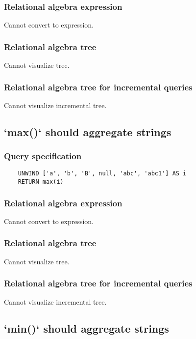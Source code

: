 	\subsubsection*{Relational algebra expression}

	Cannot convert to expression.

	\subsubsection*{Relational algebra tree}

	Cannot visualize tree.

	\subsubsection*{Relational algebra tree for incremental queries}

	Cannot visualize incremental tree.
	\subsection{`max()` should aggregate strings}

	\subsubsection*{Query specification}

	\begin{lstlisting}
	UNWIND ['a', 'b', 'B', null, 'abc', 'abc1'] AS i
	RETURN max(i)
	\end{lstlisting}


	\subsubsection*{Relational algebra expression}

	Cannot convert to expression.

	\subsubsection*{Relational algebra tree}

	Cannot visualize tree.

	\subsubsection*{Relational algebra tree for incremental queries}

	Cannot visualize incremental tree.
	\subsection{`min()` should aggregate strings}

